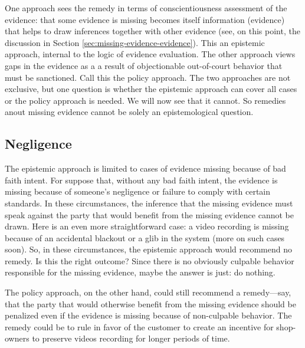\documentclass[
  10pt,
  dvipsnames,enabledeprecatedfontcommands]{scrartcl}
\begin{document}
One approach sees the remedy in terms of conscientiousness assessment of
the evidence: that some evidence is missing becomes itself information
(evidence) that helps to draw inferences together with other evidence
(see, on this point, the discussion in Section
\ref{sec:missing-evidence-evidence}). This an epistemic approach,
internal to the logic of evidence evaluation. The other approach views
gaps in the evidence as a a result of objectionable out-of-court
behavior that must be sanctioned. Call this the policy approach. The two
approaches are not exclusive, but one question is whether the epistemic
approach can cover all cases or the policy approach is needed. We will
now see that it cannot. So remedies anout missing evidence cannot be
solely an epistemological question.

\hypertarget{negligence}{%
\subsection{Negligence}\label{negligence}}

The epistemic approach is limited to cases of evidence missing because
of bad faith intent. For suppose that, without any bad faith intent, the
evidence is missing because of someone's negligence or failure to comply
with certain standards. In these circumstances, the inference that the
missing evidence must speak against the party that would benefit from
the missing evidence cannot be drawn. Here is an even more
straightforward case: a video recording is missing because of an
accidental blackout or a glib in the system (more on such cases soon).
So, in these circumstances, the epistemic approach would recommend no
remedy. Is this the right outcome? Since there is no obviously culpable
behavior responsible for the missing evidence, maybe the answer is just:
do nothing.

The policy approach, on the other hand, could still recommend a
remedy---say, that the party that would otherwise benefit from the
missing evidence should be penalized even if the evidence is missing
because of non-culpable behavior. The remedy could be to rule in favor
of the customer to create an incentive for shop-owners to preserve
videos recording for longer periods of time.
\end{document}
